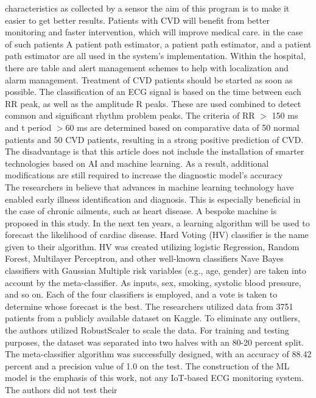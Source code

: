 \documentclass{bmcart}
\begin{document}
characteristics as collected by a sensor the aim of this program is to make it
easier to get better results. Patients with CVD will benefit from better
monitoring and faster intervention, which will improve medical care. in the case
of such patients A patient path estimator, a patient path estimator, and a
patient path estimator are all used in the system's implementation.  Within the
hospital, there are table and alert management schemes to help with localization
and alarm management. Treatment of CVD patients should be started as soon as
possible. The classification of an ECG signal is based on the time between each
RR peak, as well as the amplitude R peaks. These are used combined to detect
common and significant rhythm problem peaks. The criteria of RR $>$ 150 ms and t
period $>$60 ms are determined based on comparative data of 50 normal patients
and 50 CVD patients, resulting in a strong positive prediction of CVD. The
disadvantage is that this article does not include the installation of smarter
technologies based on AI and machine learning. As a result, additional
modifications are still required to increase the diagnostic model's accuracy\\
The researchers in \cite{9350514} believe that advances in machine learning
technology have enabled early illness identification and diagnosis. This is
especially beneficial in the case of chronic ailments, such as heart disease. A
bespoke machine is proposed in this study. In the next ten years, a learning
algorithm will be used to forecast the likelihood of cardiac disease. Hard
Voting (HV) classifier is the name given to their algorithm. HV was created
utilizing logistic Regression, Random Forest, Multilayer Perceptron, and other
well-known classifiers  Nave Bayes classifiers with Gaussian Multiple risk
variables (e.g., age, gender) are taken into account by the meta-classifier. As
inputs, sex, smoking, systolic blood pressure, and so on. Each of the four
classifiers is employed, and  a vote is taken to determine whose forecast is the
best. The researchers utilized data from 3751 patients from a publicly available
dataset on Kaggle. To eliminate any outliers, the authors utilized RobustScaler
to scale the data. For training and testing purposes, the dataset was separated
into two halves with an 80-20 percent split. The meta-classifier algorithm was
successfully designed, with an accuracy of 88.42 percent and a precision value
of 1.0 on the test. The construction of the ML model is the emphasis of this
work, not any IoT-based ECG monitoring system. The authors did not test their
\end{document}
